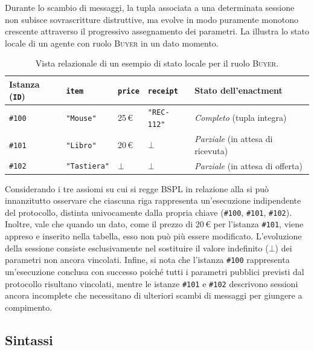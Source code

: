 Durante lo scambio di messaggi, la tupla associata a una determinata sessione non subisce sovrascritture 
distruttive, ma evolve in modo puramente monotono crescente attraverso il progressivo assegnamento dei parametri.
La  illustra lo stato locale di un agente con ruolo \textsc{Buyer} in un
dato momento.

\begin{table}[htbp]
\centering
\caption{Vista relazionale di un esempio di stato locale per il ruolo \textup{\textsc{Buyer}}.}
\label{tab:bspl_relational_example}
\begin{tabularx}{\textwidth}{l l l l >{\raggedright\arraybackslash}X}
\toprule
\textbf{Istanza (\texttt{ID})} & \textbf{\texttt{item}} & \textbf{\texttt{price}} & \textbf{\texttt{receipt}} & \textbf{Stato dell'enactment} \\
\midrule
\texttt{\#100} & \texttt{"Mouse"}    & 25\,€     & \texttt{"REC-112"} & \emph{Completo} (tupla integra) \\
\texttt{\#101} & \texttt{"Libro"}    & 20\,€     & $\bot$             & \emph{Parziale} (in attesa di ricevuta) \\
\texttt{\#102} & \texttt{"Tastiera"} & $\bot$    & $\bot$             & \emph{Parziale} (in attesa di offerta) \\
\bottomrule
\end{tabularx}
\end{table}

Considerando i tre assiomi su cui si regge BSPL in relazione alla  si può
innanzitutto osservare che ciascuna riga rappresenta un'esecuzione indipendente del protocollo,
distinta univocamente dalla propria chiave (\texttt{\#100}, \texttt{\#101}, \texttt{\#102}). 
Inoltre, vale che quando un dato, come il prezzo di 20\,€ per l'istanza \texttt{\#101}, viene appreso 
e inserito nella tabella, esso non può più essere modificato. L'evoluzione della sessione consiste
esclusivamente nel sostituire il valore indefinito ($\bot$) dei parametri non ancora vincolati. 
Infine, si nota che l'istanza \texttt{\#100} rappresenta un'esecuzione conclusa con successo poiché tutti 
i parametri pubblici previsti dal protocollo risultano vincolati, mentre le istanze \texttt{\#101}
e \texttt{\#102} descrivono sessioni ancora incomplete che necessitano di ulteriori scambi di messaggi 
per giungere a compimento.

\subsection{Sintassi}\label{bspl:sintassi}

